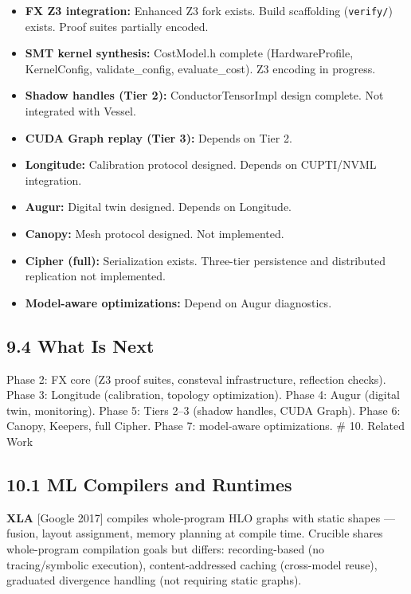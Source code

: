 \begin{itemize}
\tightlist
\item
  \textbf{FX Z3 integration:} Enhanced Z3 fork exists. Build scaffolding (\texttt{verify/}) exists. Proof suites partially encoded.
\item
  \textbf{SMT kernel synthesis:} CostModel.h complete (HardwareProfile, KernelConfig, validate\_config, evaluate\_cost). Z3 encoding in progress.
\item
  \textbf{Shadow handles (Tier 2):} ConductorTensorImpl design complete. Not integrated with Vessel.
\item
  \textbf{CUDA Graph replay (Tier 3):} Depends on Tier 2.
\item
  \textbf{Longitude:} Calibration protocol designed. Depends on CUPTI/NVML integration.
\item
  \textbf{Augur:} Digital twin designed. Depends on Longitude.
\item
  \textbf{Canopy:} Mesh protocol designed. Not implemented.
\item
  \textbf{Cipher (full):} Serialization exists. Three-tier persistence and distributed replication not implemented.
\item
  \textbf{Model-aware optimizations:} Depend on Augur diagnostics.
\end{itemize}

\subsection{9.4 What Is Next}\label{what-is-next}

Phase 2: FX core (Z3 proof suites, consteval infrastructure, reflection checks). Phase 3: Longitude (calibration, topology optimization). Phase 4: Augur (digital twin, monitoring). Phase 5: Tiers 2--3 (shadow handles, CUDA Graph). Phase 6: Canopy, Keepers, full Cipher. Phase 7: model-aware optimizations.
\# 10. Related Work

\subsection{10.1 ML Compilers and Runtimes}\label{ml-compilers-and-runtimes}

\textbf{XLA} {[}Google 2017{]} compiles whole-program HLO graphs with static shapes --- fusion, layout assignment, memory planning at compile time. Crucible shares whole-program compilation goals but differs: recording-based (no tracing/symbolic execution), content-addressed caching (cross-model reuse), graduated divergence handling (not requiring static graphs).

